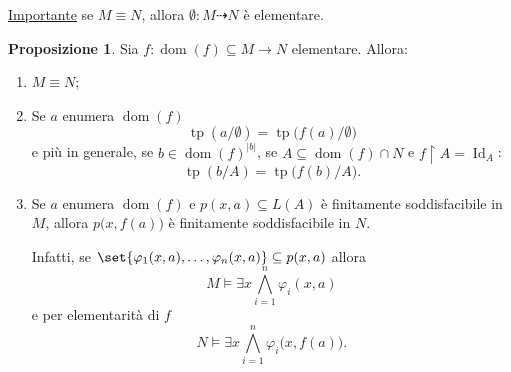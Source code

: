 \documentclass[10pt]{article}
\DeclareMathOperator{\Id}{Id}
\newcommand{\1}{\mathds{1}}
\newcommand{\partialto}{\dashrightarrow}
\theoremstyle{definition}%
\newtheorem{prop}[thm]{Proposizione}
\theoremstyle{plain}
\theoremstyle{remark}
\begin{document}
\uline{Importante} se \(M\equiv N\), allora \(\emptyset:M\partialto N\) è elementare.

\begin{prop}
Sia \(f:\operatorname{dom}(f) \subseteq M\to N\) elementare. Allora:
\begin{enumerate}
\item \(M\equiv N\);
\item Se \(a\) enumera \(\operatorname{dom}(f)\)
\begin{equation*}
 \operatorname{tp}(a/\emptyset) = \operatorname{tp}\big(f(a)/\emptyset\big)
\end{equation*}
e più in generale, se \(b \in \operatorname{dom}(f)^{|b|}\), se \(A \subseteq \operatorname{dom}(f)\cap N\) e \(f\upharpoonright A = \Id_{A}\):
\begin{equation*}
 \operatorname{tp}(b/A) = \operatorname{tp}\big(f(b)/A\big).
\end{equation*}
\item Se \(a\) enumera \(\operatorname{dom}(f)\) e \(p(x,a) \subseteq L(A)\) è finitamente soddisfacibile in \(M\), allora \(p\big(x,f(a)\big)\) è finitamente soddisfacibile in \(N\).

Infatti, se \(\set{\varphi_{1}(x,a),\dots,\varphi_{n}(x,a)} \subseteq p(x,a)\) allora
\begin{equation*}
 M\vDash \exists x \bigwedge_{i=1}^{n} \varphi_{i}(x,a)
\end{equation*}
e per elementarità di \(f\)
\begin{equation*}
 N\vDash \exists x \bigwedge_{i=1}^{n} \varphi_{i}\big(x,f(a)\big).
\end{equation*}
\end{enumerate}
\end{prop}
\end{document}
